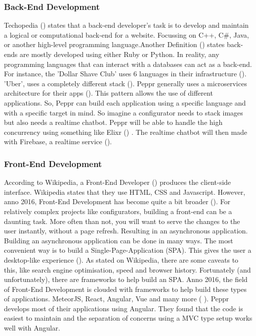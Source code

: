 \subsubsection{Back-End Development}
Techopedia (\cite{backendDevDefinition}) states that a back-end developer's task is to develop and maintain a logical or computational back-end for a website. Focussing on C++, C\#, Java, or another high-level programming language.Another Definition (\cite{backendDevDefinition}) states back-ends are mostly developed using either Ruby or Python.
In reality, any programming languages that can interact with a databases can act as a back-end. For instance, the 'Dollar Shave Club' uses 6 languages in their infrastructure (\cite{dollarShaveClubBackEnd}). 'Uber', uses a completely different stack (\cite{uberBackEnd}).
Peppr generally uses a microservices architecture for their apps (\cite{microservices}). This pattern allows the use of different applications. So, Peppr can build each application using a specific language and with a specific target in mind. So imagine a configurator needs to stack images but also needs a realtime chatbot. Peppr will be able to handle the high concurrency using something like Elixr (\cite{elixr}) . The realtime chatbot will then made with Firebase, a realtime service (\cite{firebase}).

\subsubsection{Front-End Development}
According to Wikipedia, a Front-End Developer (\cite{frontEndDevDefinition}) produces the client-side interface. Wikipedia states that they use HTML, CSS and Javascript. However, anno 2016, Front-End Development has become quite a bit broader (\cite{javascriptAnno2016}). For relatively complex projects like configurators, building a front-end can be a daunting task. More often than not, you will want to serve the changes to the user instantly, without a page refresh. Resulting in an asynchronous application.
Building an asynchronous application can be done in many ways. The most convenient way is to build a Single-Page-Application (SPA). This gives the user a desktop-like experience (\cite{singlePageApplications}). As stated on Wikipedia, there are some caveats to this, like search engine optimisation, speed and browser history. Fortunately (and unfortunately), there are frameworks to help build an SPA. Anno 2016, the field of Front-End Development is clouded with frameworks to help build these types of applications. MeteorJS, React, Angular, Vue and many more (\cite{frontEndJavascriptFrameworks} ).
Peppr develops most of their applications using Angular. They found that the code is easiest to maintain and the separation of concerns using a MVC type setup works well with Angular.

